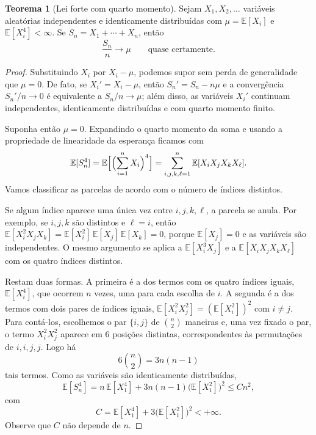 \documentclass[12pt,portuguese]{article}
\theoremstyle{definition}
\newtheorem{theorem}{Teorema}
\theoremstyle{plainexercise}
\theoremstyle{starredexercise}
\theoremstyle{definition}
\begin{document}
\begin{theorem}[Lei forte com quarto momento]\label{thm:quarto-momento}
Sejam $X_1,X_2,\ldots$ variáveis aleatórias independentes e identicamente
distribuídas com $\mu=\mathbb{E}[X_i]$ e $\mathbb{E}[X_i^4]<\infty$. Se
$S_n=X_1+\cdots+X_n$, então
\[
\frac{S_n}{n}\longrightarrow\mu
\qquad\text{quase certamente.}
\]
\end{theorem}

\begin{proof}
Substituindo $X_i$ por $X_i-\mu$, podemos supor sem perda de generalidade que
$\mu=0$. De fato, se $X_i'=X_i-\mu$, então $S_n'=S_n-n\mu$ e a convergência
$S_n'/n\to0$ é equivalente a $S_n/n\to\mu$; além disso, as variáveis $X_i'$
continuam independentes, identicamente distribuídas e com quarto momento
finito.

Suponha então $\mu=0$. Expandindo o quarto momento da soma e usando a propriedade
de linearidade da esperança ficamos com 
\begin{equation}\label{eq:expansao-quarta}
\mathbb{E}[S_n^4]
=
\mathbb{E}\Bigl[\Bigl(\sum_{i=1}^{n}X_i\Bigr)^4\Bigr]
=
\sum_{i,j,k,\ell=1}^{n}\mathbb{E}[X_iX_jX_kX_\ell].
\end{equation}
Vamos classificar as parcelas de acordo com o número de índices distintos.

Se algum índice aparece uma única vez entre $i,j,k,\ell$, a parcela se anula.
Por exemplo, se $i,j,k$ são distintos e $\ell=i$, então
$\mathbb{E}[X_i^2X_jX_k]=\mathbb{E}[X_i^2]\,\mathbb{E}[X_j]\,\mathbb{E}[X_k]=0$,
porque $\mathbb{E}[X_j]=0$ e as variáveis são independentes. O mesmo argumento
se aplica a $\mathbb{E}[X_i^3X_j]$ e a $\mathbb{E}[X_iX_jX_kX_\ell]$ com os
quatro índices distintos.

Restam duas formas. A primeira é a dos termos com os quatro índices iguais,
$\mathbb{E}[X_i^4]$, que ocorrem $n$ vezes, uma para cada escolha de $i$. A
segunda é a dos termos com dois pares de índices iguais,
$\mathbb{E}[X_i^2X_j^2]=(\mathbb{E}[X_i^2])^2$ com $i\neq j$. Para contá-los,
escolhemos o par $\{i,j\}$ de $\binom{n}{2}$ maneiras e, uma vez fixado o par, o
termo $X_i^2X_j^2$ aparece em $6$ posições distintas, correspondentes às
permutações de $i,i,j,j$. Logo há
\[
6\binom{n}{2}=3n(n-1)
\]
tais termos. Como as variáveis são identicamente distribuídas,
\begin{equation}\label{eq:cota-quarta}
\mathbb{E}[S_n^4]
=
n\,\mathbb{E}[X_1^4]+3n(n-1)\bigl(\mathbb{E}[X_1^2]\bigr)^2
\leqslant
Cn^2,
\end{equation}
com
\[
C=\mathbb{E}[X_1^4]+3\bigl(\mathbb{E}[X_1^2]\bigr)^2<+\infty.
\]
Observe que $C$ não depende de $n$.


\end{proof}
\end{document}
